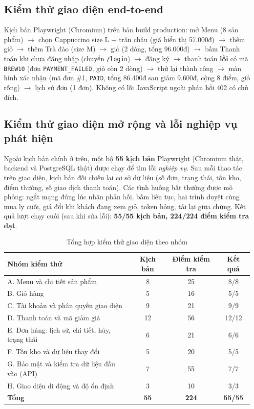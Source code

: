 \documentclass[a4paper]{article}
\newcommand{\st}[1]{\texttt{#1}}
\begin{document}
\subsection{Kiểm thử giao diện end-to-end}
Kịch bản Playwright (Chromium) trên bản build production: mở Menu (8 sản phẩm) $\to$ chọn Cappuccino size L + trân châu (giá hiển thị 57.000đ) $\to$ thêm giỏ $\to$ thêm Trà đào (size M) $\to$ giỏ (2 dòng, tổng 96.000đ) $\to$ bấm Thanh toán khi chưa đăng nhập (chuyển \texttt{/login}) $\to$ đăng ký $\to$ thanh toán \textbf{lỗi} có mã \texttt{BREW10} (đơn \st{PAYMENT\_FAILED}, giỏ còn 2 dòng) $\to$ thử lại thành công $\to$ màn hình xác nhận (mã đơn \#1, \st{PAID}, tổng 86.400đ sau giảm 9.600đ, cộng 8 điểm, giỏ rỗng) $\to$ lịch sử đơn (1 đơn). Không có lỗi JavaScript ngoài phản hồi 402 có chủ đích.

\subsection{Kiểm thử giao diện mở rộng và lỗi nghiệp vụ phát hiện}\label{sec:uitest}
Ngoài kịch bản chính ở trên, một bộ \textbf{55 kịch bản} Playwright (Chromium thật, backend và PostgreSQL thật) được chạy để tìm lỗi \emph{nghiệp vụ}. Sau mỗi thao tác trên giao diện, kịch bản đối chiếu lại cơ sở dữ liệu (số đơn, trạng thái, tồn kho, điểm thưởng, số giao dịch thanh toán). Các tình huống bất thường được mô phỏng: ngắt mạng đúng lúc nhận phản hồi, bấm liên tục, hai trình duyệt cùng mua ly cuối, giá đổi khi khách đang xem giỏ, token hỏng, tải lại giữa chừng. Kết quả lượt chạy cuối (sau khi sửa lỗi): \textbf{55/55 kịch bản, 224/224 điểm kiểm tra đạt}.

\begin{table}[h!]
\centering
\begin{tabularx}{\textwidth}{|X|c|c|c|}
\hline
\textbf{Nhóm kiểm thử} & \textbf{Kịch bản} & \textbf{Điểm kiểm tra} & \textbf{Kết quả} \\ \hline
A. Menu và chi tiết sản phẩm & 8 & 25 & 8/8 \\ \hline
B. Giỏ hàng & 5 & 16 & 5/5 \\ \hline
C. Tài khoản và phân quyền giao diện & 9 & 21 & 9/9 \\ \hline
D. Thanh toán và mã giảm giá & 12 & 56 & 12/12 \\ \hline
E. Đơn hàng: lịch sử, chi tiết, hủy, trạng thái & 6 & 21 & 6/6 \\ \hline
F. Tồn kho và dữ liệu thay đổi & 5 & 20 & 5/5 \\ \hline
G. Bảo mật và kiểm tra dữ liệu đầu vào (API) & 7 & 55 & 7/7 \\ \hline
H. Giao diện di động và độ ổn định & 3 & 10 & 3/3 \\ \hline
\textbf{Tổng} & \textbf{55} & \textbf{224} & \textbf{55/55} \\ \hline
\end{tabularx}
\caption{Tổng hợp kiểm thử giao diện theo nhóm}
\end{table}
\end{document}
